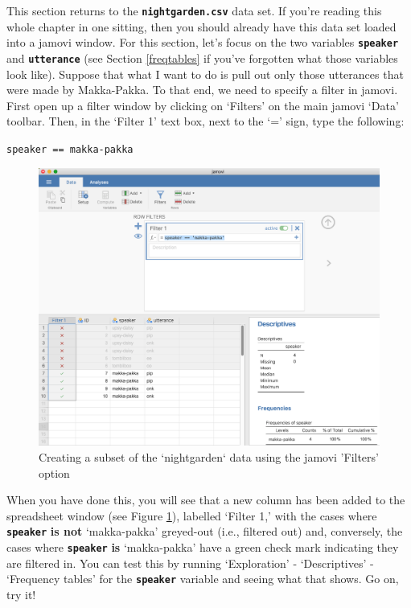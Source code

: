 \documentclass[
]{book}
\begin{document}
This section returns to the \textbf{\texttt{nightgarden.csv}} data set. If you're reading this whole chapter in one sitting, then you should already have this data set loaded into a jamovi window. For this section, let's focus on the two variables \textbf{\texttt{speaker}} and \textbf{\texttt{utterance}} (see Section \ref{freqtables} if you've forgotten what those variables look like). Suppose that what I want to do is pull out only those utterances that were made by Makka-Pakka. To that end, we need to specify a filter in jamovi. First open up a filter window by clicking on `Filters' on the main jamovi `Data' toolbar. Then, in the `Filter 1' text box, next to the `=' sign, type the following:

\texttt{speaker\ ==\ \textquotesingle{}makka-pakka\textquotesingle{}}

\begin{figure}

{\centering \includegraphics[width=1\linewidth]{img/mechanics/subset1} 

}

\caption{Creating a subset of the `nightgarden` data using the jamovi 'Filters' option}\label{fig:subset1}
\end{figure}

When you have done this, you will see that a new column has been added to the spreadsheet window (see Figure \ref{fig:subset1}), labelled `Filter 1,' with the cases where \textbf{\texttt{speaker}} \textbf{is not} `makka-pakka' greyed-out (i.e., filtered out) and, conversely, the cases where \textbf{\texttt{speaker}} \textbf{is} `makka-pakka' have a green check mark indicating they are filtered in. You can test this by running `Exploration' - `Descriptives' - `Frequency tables' for the \textbf{\texttt{speaker}} variable and seeing what that shows. Go on, try it!
\end{document}
